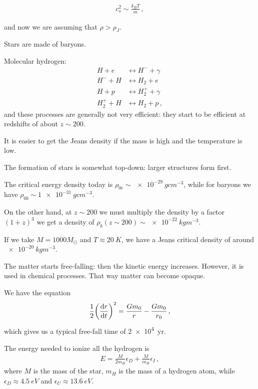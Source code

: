 \documentclass[main.tex]{subfiles}
\begin{document}
%
\begin{align}
  c_s^2 \sim \frac{k_B T}{\overline{m}}
\,,
\end{align}
%

and now we are assuming that \(\rho > \rho _J\). 

Stars are made of baryons. 

Molecular hydrogen: 
%
\begin{subequations}
\begin{align}
  H + e &\leftrightarrow H^{-} + \gamma  \\
  H^{-} + H &\leftrightarrow H_2 + e  \\
   H+ p &\leftrightarrow H_2^{+} + \gamma  \\
  H_2^{+} + H &\leftrightarrow H_2 + p
\,,
\end{align}
\end{subequations}
%
and these processes are generally not very efficient: they start to be efficient at redshifts of about \(z \sim 200\). 

It is easier to get the Jeans density if the mass is high and the temperature is low. 

The formation of stars is somewhat top-down: larger structures form first. 

The critical energy density today is  \(\rho_{0c} \sim \SI{e-29}{g cm^{-3}}\), while for baryons we have \(\rho_{0b} \sim \SI{1e-31}{g cm^{-3}}\). 

On the other hand, at \(z \sim 200 \) we must multiply the density by a factor \((1+z)^3\) we get a density of \(\rho_{b} (z \sim 200) \sim \SI{e-22}{kg m^{-3}}\). 

If we take \(M = 1000 M_{\odot}\) and \(T \approx \SI{20}{K}\), we have a Jeans critical density of around \(\SI{e-20}{kg m^{-3}}\). 


The matter starts free-falling: then the kinetic energy increases. 
However, it is used in chemical processes. That way matter can become opaque. 

We have the equation 
%
\begin{align}
  \frac{1}{2} \qty(\dv{r}{t})^2 = \frac{G m_0 }{r} - \frac{G m_0 }{r_0 }
\,,
\end{align}
%
which gives us a typical free-fall time of \SI{2e4}{yr}. 

The energy needed to ionize all the hydrogen is 
%
\begin{align}
  E = \frac{M}{2 m_H} \epsilon_{D} + \frac{M}{m_H} \epsilon_{I}
\,,
\end{align}
%
where \(M\) is the mass of the star, \(m_H\) is the mass of a hydrogen atom, while \(\epsilon_{D} \approx \SI{4.5}{eV}\) and \(\epsilon_{U} \approx \SI{13.6}{eV}\). 
\end{document}
